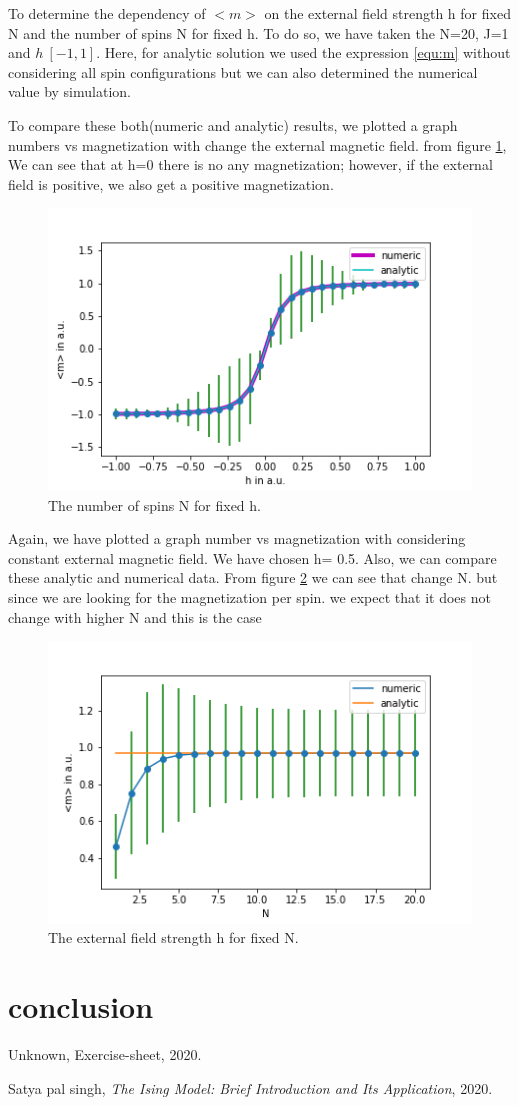 \documentclass[11pt, a4paper, DIV=12]{scrartcl}
\begin{document}
To determine the dependency of $ <m> $ on the external field strength h for fixed N and the number of spins N for fixed h. To do so, we have taken the N=20, J=1 and $h \ [-1, 1]$. Here, for analytic solution we used the expression \ref{equ:m} without considering all spin configurations but we can also determined the numerical value by simulation.

To compare these both(numeric and analytic) results, we plotted a graph numbers vs magnetization with change the external magnetic field. from figure \ref{fig:Nconst}, We can see that at h=0 there is no any magnetization; however, if the external field is positive, we also get a positive magnetization. 
\begin{figure}[H]
	\centering
	\includegraphics[width=0.8\linewidth]{Nconst.png}
	\caption{The number of spins N for fixed h.}
	\label{fig:Nconst}
\end{figure}


Again, we have plotted a graph number vs magnetization with considering constant external magnetic field. We have chosen h= 0.5. Also, we can compare these analytic and numerical data. From figure \ref{fig:hconst} we can see that change N. but since we are looking for the magnetization per spin. we expect that it does not change with higher N and this is the case
   \begin{figure}[H]
   	\centering
   	\includegraphics[width=0.8\linewidth]{hconst.png}
   	\caption{The external field strength h for fixed N.}
   	\label{fig:hconst}
   \end{figure}
\section{conclusion}

\begin{thebibliography}{12}
	Unknown, Exercise-sheet, 2020.
		
	Satya pal singh, \textit{The Ising Model: Brief Introduction and Its Application}, 2020.
	
\end{thebibliography}
\end{document}
